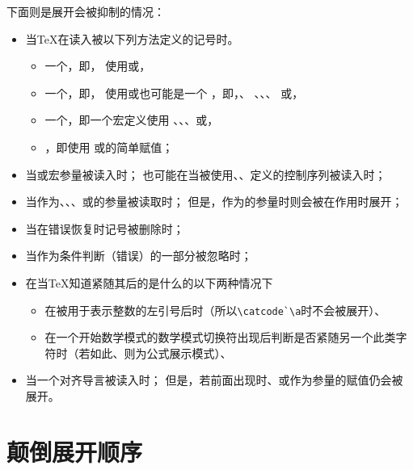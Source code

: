 \documentclass{book}
\begin{document}
下面则是展开会被抑制的情况：
\begin{itemize}\label{noexp:list}
\item 当{\TeX}在读入被以下列方法定义的记号时。
    \begin{itemize} \item 一个，即，
           使用或，
        \item 一个，即，
           使用或也可能是一个
           ，即，、
           、、、
           或，
        \item 一个，即一个宏定义使用
           、、、或，
        \item {}，即使用 或的简单赋值；
    \end{itemize}
\item 当或宏参量被读入时；
      也可能在当被使用、、定义的控制序列被读入时；
\item 当作为、、、或的参量被读取时；
      但是，作为的参量时则会被在作用时展开；
\item 当在错误恢复时记号被删除时；
\item 当作为条件判断（错误）的一部分被忽略时；
\item 在当{\TeX}知道紧随其后的是什么的以下两种情况下
    \begin{itemize}\item 在被用于表示整数的左引号后时（所以\verb-\catcode`\a-时不会被展开）、
        \item 在一个开始数学模式的数学模式切换符出现后判断是否紧随另一个此类字符时（若如此、则为公式展示模式）、
    \end{itemize}
\item 当一个对齐导言被读入时；
      但是，若前面出现时、或作为参量的赋值仍会被展开。
\end{itemize}

\section{颠倒展开顺序}
\end{document}
